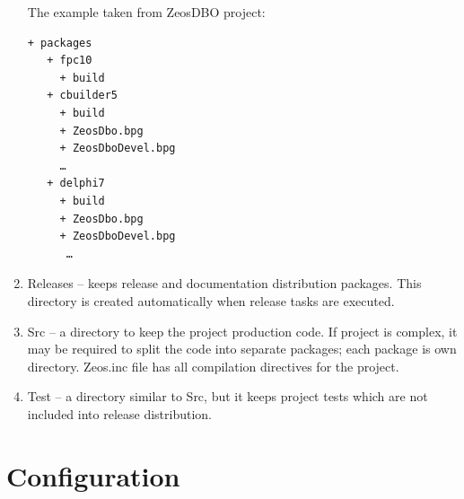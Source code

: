 \documentclass[a4paper,12pt,oneside]{book}
\begin{document}
\begin{enumerate}
	  The example taken from ZeosDBO project:
    \begin{verbatim}
+ packages
   + fpc10
     + build
   + cbuilder5
     + build
     + ZeosDbo.bpg
     + ZeosDboDevel.bpg
     …
   + delphi7
     + build
     + ZeosDbo.bpg
     + ZeosDboDevel.bpg
      …
    \end{verbatim}
  \item
		Releases – keeps release and documentation distribution packages.
		This directory is created automatically when release tasks are executed.
	\item
	  Src – a directory to keep the project production code.
		If project is complex, it may be required to split the code into separate packages; each package is own directory.
		Zeos.inc file has all compilation directives for the project.
	\item
	  Test – a directory similar to Src, but it keeps project tests which are not included into release distribution.
\end{enumerate}

\section{Configuration}
\end{document}
